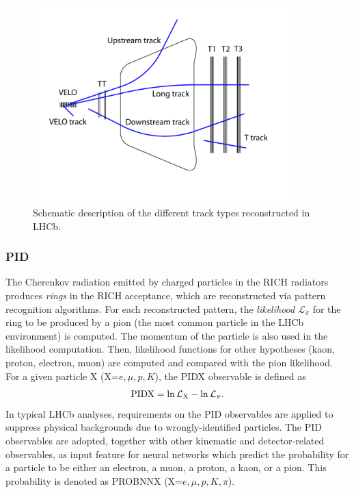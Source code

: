 \begin{figure}[htbp]
  \begin{center}
    \includegraphics[width=0.9\textwidth]{02LHCb/figs/trackTypes.pdf}
  \end{center}
  \vspace{-15mm}
  \caption{Schematic description of the different track types reconstructed in LHCb.}
  \label{fig:trackTypes}
\end{figure}

\subsubsection*{PID}
The Cherenkov radiation emitted by charged particles in the RICH radiators produces \emph{rings} in the RICH acceptance, which are reconstructed via pattern recognition algorithms.
For each reconstructed pattern, the \emph{likelihood} $\mathcal L_{\pi}$ for the ring to be produced by a pion (the most common particle in the LHCb environment) is computed.
The momentum of the particle is also used in the likelihood computation.
Then, likelihood functions for other hypotheses (kaon, proton, electron, muon) are computed and compared with the pion likelihood.
For a given particle X (X=$e,\mu,p,K$), the PIDX observable is defined as
\begin{equation}
	\label{eq:pidx}
	\rm PIDX = \ln \mathcal L_{\rm X} - \ln \mathcal L_{\pi}.
\end{equation}
In typical LHCb analyses, requirements on the PID observables are applied to suppress physical backgrounds due to wrongly-identified particles.
The PID observables are adopted, together with other kinematic and detector-related observables, as input feature for neural networks which predict the probability for a
particle to be either an electron, a muon, a proton, a kaon, or a pion. This probability is denoted as PROBNNX (X=$e,\mu,p,K,\pi$).

